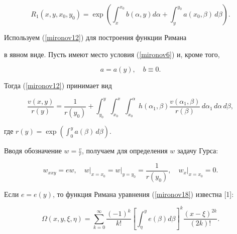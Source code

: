 $$


R_{1}(x,y,x_{0}, y_{0})=\exp\left( \int_{x}^{x_{0}} b(\alpha,y)d\alpha+


\int_{y}^{y_{0}} a(x_{0}, \beta)\,d\beta \right) .


$$





Используем (\ref{mironov12}) для построения функции Римана


в явном виде. Пусть имеют место условия (\ref{mironov6}) и, кроме того,


\begin{equation}\label{mironov16}


a=a(y),\quad b\equiv 0.


\end{equation}


Тогда (\ref{mironov12}) принимает вид


\begin{equation*}%


\frac{v(x,y)}{r(y)}=\frac{1}{r(y_{0})}


+\int_{y_{0}}^{y}\int_{x_{0}}^{x}\int_{x_{0}}^{\alpha}


h(\alpha_{1},\beta)\frac{v(\alpha_{1},\beta)}{r(\beta)} \,d\alpha_{1}\,


d\alpha \,d\beta,\end{equation*}


где $


r(y)=\exp\left( \displaystyle


\int_{0}^{y} a(\beta)\, d\beta


\right)$.





Вводя обозначение $w=\frac vr$, получаем для определения $w$ задачу Гурса:


\begin{equation}\label{mironov18}


w_{xxy}=ew,\quad w\Big\vert_{x=x_{0}}\!\!\!=w\Big\vert_{y=y_{0}}\!\!\!=\frac{1}{r(y_{0})},


\quad w_{x}\Big\vert_{x=x_{0}}\!\!\!=0.


\end{equation}


Если $e=e(y)$, то функция Римана уравнения (\ref{mironov18}) известна [1]:


\begin{equation}\label{mironov19}


\Omega(x,y,\xi,\eta)=\sum_{k=0}^{\infty}\frac{(-1)^{k}}{k!}


\left[ \int_{\eta}^{y} e(\beta)d\beta \right]^{k}\frac{(x-\xi)^{2k}}{(2k)!}.


\end{equation}


